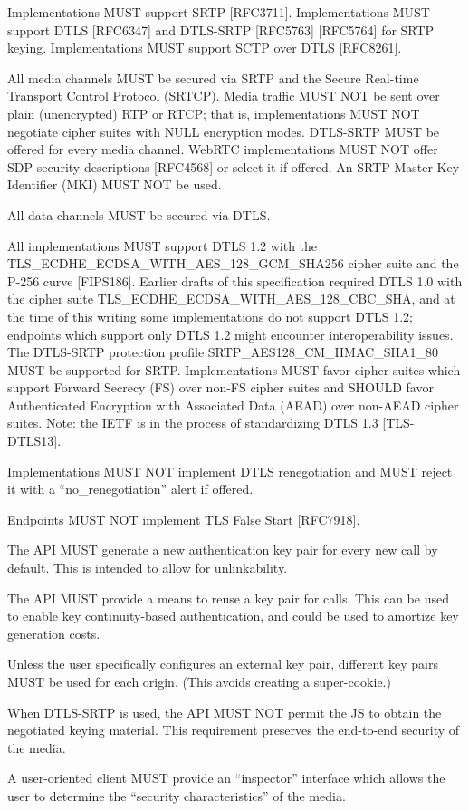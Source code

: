 \documentclass{article}
\begin{document}
Implementations MUST support SRTP [RFC3711].  Implementations MUST
support DTLS [RFC6347] and DTLS-SRTP [RFC5763] [RFC5764] for SRTP
keying.  Implementations MUST support SCTP over DTLS [RFC8261].

All media channels MUST be secured via SRTP and the Secure Real-time
Transport Control Protocol (SRTCP).  Media traffic MUST NOT be sent
over plain (unencrypted) RTP or RTCP; that is, implementations MUST
NOT negotiate cipher suites with NULL encryption modes.  DTLS-SRTP
MUST be offered for every media channel.  WebRTC implementations MUST
NOT offer SDP security descriptions [RFC4568] or select it if
offered.  An SRTP Master Key Identifier (MKI) MUST NOT be used.

All data channels MUST be secured via DTLS.

All implementations MUST support DTLS 1.2 with the
TLS\_ECDHE\_ECDSA\_WITH\_AES\_128\_GCM\_SHA256 cipher suite and the P-256
curve [FIPS186].  Earlier drafts of this specification required DTLS
1.0 with the cipher suite TLS\_ECDHE\_ECDSA\_WITH\_AES\_128\_CBC\_SHA, and
at the time of this writing some implementations do not support DTLS
1.2; endpoints which support only DTLS 1.2 might encounter
interoperability issues.  The DTLS-SRTP protection profile
SRTP\_AES128\_CM\_HMAC\_SHA1\_80 MUST be supported for SRTP.
Implementations MUST favor cipher suites which support Forward
Secrecy (FS) over non-FS cipher suites and SHOULD favor Authenticated
Encryption with Associated Data (AEAD) over non-AEAD cipher suites.
Note: the IETF is in the process of standardizing DTLS 1.3
[TLS-DTLS13].

Implementations MUST NOT implement DTLS renegotiation and MUST reject
it with a ``no\_renegotiation'' alert if offered.

Endpoints MUST NOT implement TLS False Start [RFC7918].

\begin{description}[style=nextline]
\item[API Requirement:] The API MUST generate a new authentication key pair
  for every new call by default.  This is intended to allow for
  unlinkability.

\item[API Requirement:] The API MUST provide a means to reuse a key pair
  for calls.  This can be used to enable key continuity-based
  authentication, and could be used to amortize key generation
  costs.

\item[API Requirement:] Unless the user specifically configures an external
  key pair, different key pairs MUST be used for each origin.  (This
  avoids creating a super-cookie.)

\item[API Requirement:] When DTLS-SRTP is used, the API MUST NOT permit the
  JS to obtain the negotiated keying material.  This requirement
  preserves the end-to-end security of the media.

\item[UI Requirements:] A user-oriented client MUST provide an ``inspector''
  interface which allows the user to determine the ``security
  characteristics'' of the media.
\end{description}
\end{document}
